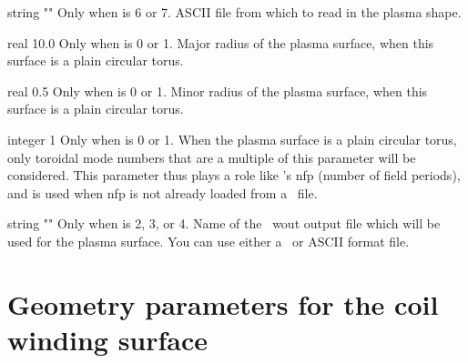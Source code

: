 \myhrule

{string}
{{\ttfamily ""}}
{Only when  is 6 or 7.}
{ASCII file from which to read in the plasma shape.}

\myhrule

{real}
{10.0}
{Only when  is 0 or 1.}
{Major radius of the plasma surface, when this surface is a plain circular torus.}

\myhrule

{real}
{0.5}
{Only when  is 0 or 1.}
{Minor radius of the plasma surface, when this surface is a plain circular torus.}

\myhrule

{integer}
{1}
{Only when  is 0 or 1.}
{When the plasma surface is a plain circular torus, only toroidal mode numbers that are a multiple of this parameter will be considered.
This parameter thus plays a role like \vmec's {\ttfamily nfp} (number of field periods),
and is used when {\ttfamily nfp} is not already loaded from a \vmec~file.}

\myhrule

{string}
{{\ttfamily ""}}
{Only when  is 2, 3, or 4.}
{Name of the \vmec~{\ttfamily wout} output file which will be used for the plasma surface.
You can use either a \netCDF~or {\ttfamily ASCII} format file.}

\section{Geometry parameters for the coil winding surface}

